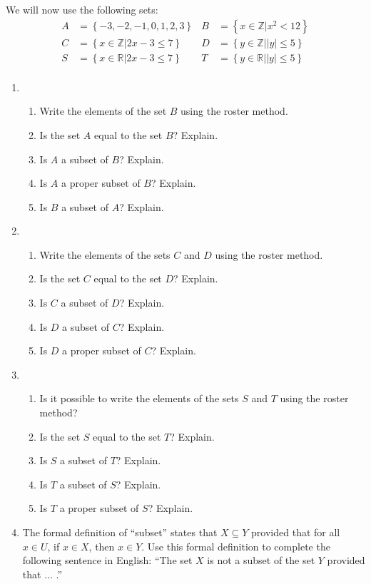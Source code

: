 \begin{previewactivity}
We will now use the following sets:
\[
\begin{aligned}
A &= \left\{ { - 3, - 2, - 1,0,1,2,3} \right\}  &  B &= \left\{ {\left. {x \in \mathbb{Z}} \right|x^2  < 12} \right\} \\
C &= \left\{ {\left. {x \in \mathbb{Z}} \right|2x - 3 \leq 7} \right\}  &  D &= \left\{ {\left. {y \in \mathbb{Z}} \right|\left| y \right| \leq 5} \right\}   \\
S &= \left\{ {\left. {x \in \mathbb{R}} \right|2x - 3 \leq 7} \right\}  &  T &= \left\{ {\left. {y \in \mathbb{R}} \right|\left| y \right| \leq 5} \right\}  \\
\end{aligned}
\]
%
\begin{enumerate} \item \begin{enumerate}
  \item Write the elements of the set  $B$  using the roster method.
  \item Is the set  $A$   equal to the set  $B$?  Explain.
  \item Is  $A$  a subset of  $B$?  Explain.
  \item Is $A$ a proper subset of $B$?  Explain.
  \item Is  $B$  a subset of  $A$?  Explain.
\end{enumerate}

\item \begin{enumerate} \item Write the elements of the sets  $C$  and  $D$  using the roster method.
  \item Is the set  $C$   equal to the set  $D$?  Explain.
  \item Is  $C$  a subset of  $D$?  Explain.
  \item Is  $D$  a subset of  $C$?  Explain.
  \item Is  $D$  a proper subset of $C$?  Explain.
\end{enumerate}

\item \begin{enumerate} \item Is it possible to write the elements of the sets  $S$  and  $T$  using the roster method?
  \item Is the set  $S$   equal to the set  $T$?  Explain.
  \item Is  $S$  a subset of  $T$?  Explain.
  \item Is  $T$  a subset of  $S$?  Explain.
  \item Is  $T$  a proper subset of $S$?  Explain.
\end{enumerate}

\item The formal definition of ``subset'' states that  $X \subseteq Y$ provided that for all 
$x \in U$, if $x \in X$, then $x \in Y$.  Use this formal definition to complete the following sentence in English:  ``The set  $X$   is not a subset of the set  $Y$ provided that $\ldots$ .''

\end{enumerate}
\end{previewactivity}
